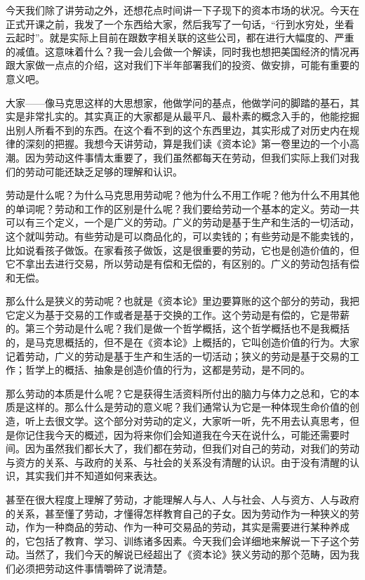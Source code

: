 \documentclass[UTF8, 12pt, a4paper]{ctexrep}
\begin{document}
今天我们除了讲劳动之外，还想花点时间讲一下子现下的资本市场的状况。今天在正式开课之前，我发了一个东西给大家，然后我写了一句话，“行到水穷处，坐看云起时”。就是实际上目前在跟数字相关联的这些公司，都在进行大幅度的、严重的减值。这意味着什么？我一会儿会做一个解读，同时我也想把美国经济的情况再跟大家做一点点的介绍，这对我们下半年部署我们的投资、做安排，可能有重要的意义吧。

大家——像马克思这样的大思想家，他做学问的基点，他做学问的脚踏的基石，其实是非常扎实的。其实真正的大家都是从最平凡、最朴素的概念入手的，他能挖掘出别人所看不到的东西。在这个看不到的这个东西里边，其实形成了对历史内在规律的深刻的把握。我想今天讲劳动，算是我们读《资本论》第一卷里边的一个小高潮。因为劳动这件事情太重要了，我们虽然都每天在劳动，但我们实际上我们对我们的劳动可能还缺乏足够的理解和认识。

劳动是什么呢？为什么马克思用劳动呢？他为什么不用工作呢？他为什么不用其他的单词呢？劳动和工作的区别是什么呢？我们要给劳动一个基本的定义。劳动一共可以有三个定义，一个是广义的劳动。广义的劳动是基于生产和生活的一切活动，这个就叫劳动。有些劳动是可以商品化的，可以卖钱的；有些劳动是不能卖钱的，比如说看孩子做饭。在家看孩子做饭，这是很重要的劳动，它也是创造价值的，但它不拿出去进行交易，所以劳动是有偿和无偿的，有区别的。广义的劳动包括有偿和无偿。

那么什么是狭义的劳动呢？也就是《资本论》里边要算账的这个部分的劳动，我把它定义为基于交易的工作或者是基于交换的工作。这个劳动是有偿的，它是带薪的。第三个劳动是什么呢？我们是做一个哲学概括，这个哲学概括也不是我概括的，是马克思概括的，但不是在《资本论》上概括的，它叫创造价值的行为。大家记着劳动，广义的劳动是基于生产和生活的一切活动；狭义的劳动是基于交易的工作；哲学上的概括、抽象是创造价值的行为，这都是劳动，是不同的。

那么劳动的本质是什么呢？它是获得生活资料所付出的脑力与体力之总和，它的本质是这样的。那么什么是劳动的意义呢？我们通常认为它是一种体现生命价值的创造，听上去很文学。这个部分对劳动的定义，大家听一听，先不用去认真思考，但是你记住我今天的概述，因为将来你们会知道我在今天在说什么，可能还需要时间。因为虽然我们都长大了，我们都在劳动，但我们对自己的劳动，对我们的劳动与资方的关系、与政府的关系、与社会的关系没有清醒的认识。由于没有清醒的认识，其实我们并不知道如何来表达。

甚至在很大程度上理解了劳动，才能理解人与人、人与社会、人与资方、人与政府的关系，甚至懂了劳动，才懂得怎样教育自己的子女。因为劳动作为一种狭义的劳动，作为一种商品的劳动、作为一种可交易品的劳动，其实是需要进行某种养成的，它包括了教育、学习、训练诸多因素。今天我们会详细地来解说一下子这个劳动。当然了，我们今天的解说已经超出了《资本论》狭义劳动的那个范畴，因为我们必须把劳动这件事情嚼碎了说清楚。
\end{document}
